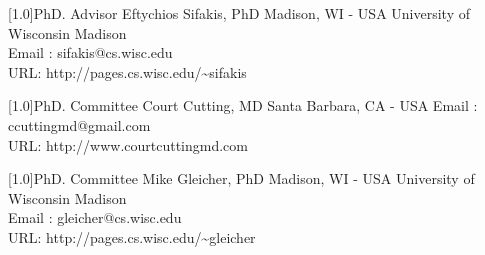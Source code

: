 \documentclass{cv-style}     %
\begin{document}
\begin{entrylist}


 \entry
{\scalebox{.8}[1.0]{PhD. Advisor}}
 {Eftychios Sifakis, PhD}
 {Madison, WI - USA}
{
 University of Wisconsin Madison\\
Email : sifakis@cs.wisc.edu\\
URL: http://pages.cs.wisc.edu/\textasciitilde{}sifakis
 } 

 \entry
{\scalebox{.8}[1.0]{PhD. Committee}}
 {Court Cutting, MD}
 {Santa Barbara, CA - USA}
{
Email : ccuttingmd@gmail.com\\
URL: http://www.courtcuttingmd.com
 } 


 \entry
{\scalebox{.8}[1.0]{PhD. Committee}}
 {Mike Gleicher, PhD}
 {Madison, WI - USA}
{
 University of Wisconsin Madison\\
Email : gleicher@cs.wisc.edu\\
URL: http://pages.cs.wisc.edu/\textasciitilde{}gleicher
 } 




\end{entrylist}
\end{document}
